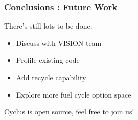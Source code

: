
\begin{frame}
  \frametitle{Conclusions : Future Work}
  There's still lots to be done:
  \begin{itemize}
    \item Discuss with VISION team
    \item Profile existing code
    \item Add recycle capability
    \item Explore more fuel cycle option space
  \end{itemize}
  Cyclus is open source, feel free to join us!
\end{frame}

